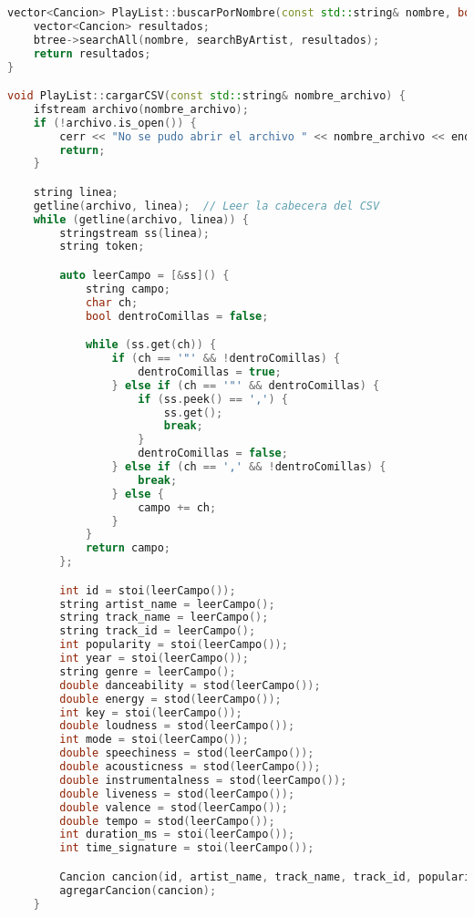 \documentclass[corference]{IEEEtran}
\begin{document}
\begin{flushleft}
\begin{lstlisting}[language=C++, style=mystyle, caption={Código de la Clase Playlist}]
vector<Cancion> PlayList::buscarPorNombre(const std::string& nombre, bool searchByArtist) {
    vector<Cancion> resultados;
    btree->searchAll(nombre, searchByArtist, resultados);
    return resultados;
}

void PlayList::cargarCSV(const std::string& nombre_archivo) {
    ifstream archivo(nombre_archivo);
    if (!archivo.is_open()) {
        cerr << "No se pudo abrir el archivo " << nombre_archivo << endl;
        return;
    }

    string linea;
    getline(archivo, linea);  // Leer la cabecera del CSV
    while (getline(archivo, linea)) {
        stringstream ss(linea);
        string token;

        auto leerCampo = [&ss]() {
            string campo;
            char ch;
            bool dentroComillas = false;

            while (ss.get(ch)) {
                if (ch == '"' && !dentroComillas) {
                    dentroComillas = true;
                } else if (ch == '"' && dentroComillas) {
                    if (ss.peek() == ',') {
                        ss.get();
                        break;
                    }
                    dentroComillas = false;
                } else if (ch == ',' && !dentroComillas) {
                    break;
                } else {
                    campo += ch;
                }
            }
            return campo;
        };

        int id = stoi(leerCampo());
        string artist_name = leerCampo();
        string track_name = leerCampo();
        string track_id = leerCampo();
        int popularity = stoi(leerCampo());
        int year = stoi(leerCampo());
        string genre = leerCampo();
        double danceability = stod(leerCampo());
        double energy = stod(leerCampo());
        int key = stoi(leerCampo());
        double loudness = stod(leerCampo());
        int mode = stoi(leerCampo());
        double speechiness = stod(leerCampo());
        double acousticness = stod(leerCampo());
        double instrumentalness = stod(leerCampo());
        double liveness = stod(leerCampo());
        double valence = stod(leerCampo());
        double tempo = stod(leerCampo());
        int duration_ms = stoi(leerCampo());
        int time_signature = stoi(leerCampo());

        Cancion cancion(id, artist_name, track_name, track_id, popularity, year, genre, danceability, energy, key, loudness, mode, speechiness, acousticness, instrumentalness, liveness, valence, tempo, duration_ms, time_signature);
        agregarCancion(cancion);
    }


\end{lstlisting}
\end{flushleft}
\end{document}
